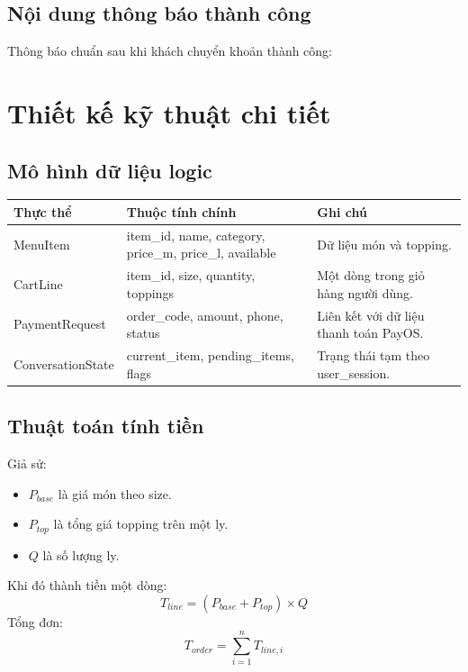 \documentclass[12pt,a4paper]{article}
\begin{document}
\subsection{Nội dung thông báo thành công}
Thông báo chuẩn sau khi khách chuyển khoản thành công:
\begin{center}
\end{center}

\section{Thiết kế kỹ thuật chi tiết}
\subsection{Mô hình dữ liệu logic}
\begin{longtable}{p{3.2cm}p{3.5cm}p{5.5cm}}
\toprule
\textbf{Thực thể} & \textbf{Thuộc tính chính} & \textbf{Ghi chú} \\
\midrule
MenuItem & item\_id, name, category, price\_m, price\_l, available & Dữ liệu món và topping. \\
CartLine & item\_id, size, quantity, toppings & Một dòng trong giỏ hàng người dùng. \\
PaymentRequest & order\_code, amount, phone, status & Liên kết với dữ liệu thanh toán PayOS. \\
ConversationState & current\_item, pending\_items, flags & Trạng thái tạm theo user\_session. \\
\bottomrule
\end{longtable}

\subsection{Thuật toán tính tiền}
Giả sử:
\begin{itemize}
    \item $P_{base}$ là giá món theo size.
    \item $P_{top}$ là tổng giá topping trên một ly.
    \item $Q$ là số lượng ly.
\end{itemize}
Khi đó thành tiền một dòng:
\[
T_{line} = (P_{base} + P_{top}) \times Q
\]
Tổng đơn:
\[
T_{order} = \sum_{i=1}^{n} T_{line,i}
\]
\end{document}
